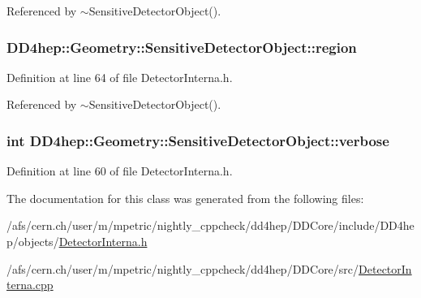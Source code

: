 Referenced by $\sim$SensitiveDetectorObject().\hypertarget{class_d_d4hep_1_1_geometry_1_1_sensitive_detector_object_a022b7c934478f9778969ab16629d93c6}{
\subsubsection[{region}]{ {\bf DD4hep::Geometry::SensitiveDetectorObject::region}}}
\label{class_d_d4hep_1_1_geometry_1_1_sensitive_detector_object_a022b7c934478f9778969ab16629d93c6}


Definition at line 64 of file DetectorInterna.h.

Referenced by $\sim$SensitiveDetectorObject().\hypertarget{class_d_d4hep_1_1_geometry_1_1_sensitive_detector_object_aeb8289c1e8386dcf52041d1bae827cfa}{
\subsubsection[{verbose}]{\setlength{\rightskip}{0pt plus 5cm}int {\bf DD4hep::Geometry::SensitiveDetectorObject::verbose}}}
\label{class_d_d4hep_1_1_geometry_1_1_sensitive_detector_object_aeb8289c1e8386dcf52041d1bae827cfa}


Definition at line 60 of file DetectorInterna.h.

The documentation for this class was generated from the following files:\begin{DoxyCompactItemize}
\item 
/afs/cern.ch/user/m/mpetric/nightly\_\-cppcheck/dd4hep/DDCore/include/DD4hep/objects/\hyperlink{_detector_interna_8h}{DetectorInterna.h}\item 
/afs/cern.ch/user/m/mpetric/nightly\_\-cppcheck/dd4hep/DDCore/src/\hyperlink{_detector_interna_8cpp}{DetectorInterna.cpp}\end{DoxyCompactItemize}
